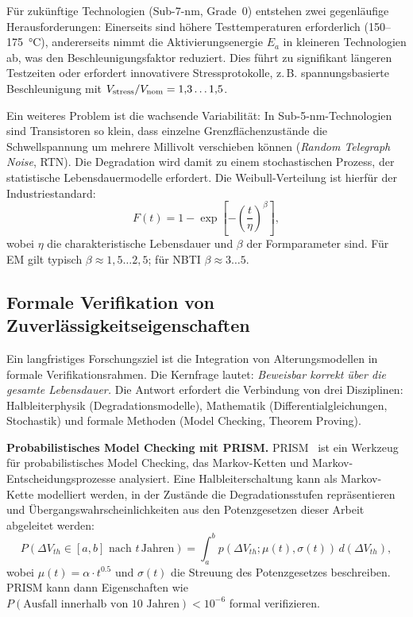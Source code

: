 ﻿\documentclass[a4paper,12pt]{article}
\theoremstyle{definition}
\begin{document}
Für zukünftige Technologien (Sub-7-nm, Grade~0) entstehen zwei gegenläufige
Herausforderungen: Einerseits sind höhere Testtemperaturen erforderlich
(150--175\, °C), andererseits nimmt die Aktivierungsenergie $E_a$ in
kleineren Technologien ab, was den Beschleunigungsfaktor reduziert. Dies
führt zu signifikant längeren Testzeiten oder erfordert innovativere
Stressprotokolle, z.\,B. spannungsbasierte Beschleunigung mit
$V_{\rm stress} / V_{\rm nom} = 1{,}3\ldots 1{,}5$.

Ein weiteres Problem ist die wachsende Variabilität: In Sub-5-nm-Technologien
sind Transistoren so klein, dass einzelne Grenzflächenzustände die
Schwellspannung um mehrere Millivolt verschieben können (\emph{Random
Telegraph Noise}, RTN). Die Degradation wird damit zu einem stochastischen
Prozess, der statistische Lebensdauermodelle erfordert. Die Weibull-Verteilung
ist hierfür der Industriestandard:
\[
F(t) = 1 - \exp\!\left[-\left(\frac{t}{\eta}\right)^\beta\right],
\]
wobei $\eta$ die charakteristische Lebensdauer und $\beta$ der Formparameter sind.
Für EM gilt typisch $\beta \approx 1{,}5\ldots 2{,}5$; für NBTI $\beta \approx 3\ldots 5$.

\subsection{Formale Verifikation von Zuverlässigkeitseigenschaften}
\label{sub:formal}

Ein langfristiges Forschungsziel ist die Integration von Alterungsmodellen in
formale Verifikationsrahmen. Die Kernfrage lautet: \emph{Beweisbar korrekt über
die gesamte Lebensdauer.} Die Antwort erfordert die Verbindung von drei Disziplinen:
Halbleiterphysik (Degradationsmodelle), Mathematik (Differentialgleichungen,
Stochastik) und formale Methoden (Model Checking, Theorem Proving).

\textbf{Probabilistisches Model Checking mit PRISM.}
PRISM~\cite{kwiatkowska2011} ist ein Werkzeug für probabilistisches Model Checking,
das Markov-Ketten und Markov-Entscheidungsprozesse analysiert. Eine
Halbleiterschaltung kann als Markov-Kette modelliert werden, in der Zustände
die Degradationsstufen repräsentieren und Übergangswahrscheinlichkeiten aus
den Potenzgesetzen dieser Arbeit abgeleitet werden:
\[
P(\Delta V_{th} \in [a, b] \text{ nach } t\,\text{Jahren}) =
\int_a^b p(\Delta V_{th}; \mu(t), \sigma(t))\, d(\Delta V_{th}),
\]
wobei $\mu(t) = \alpha \cdot t^{0.5}$ und $\sigma(t)$ die Streuung des
Potenzgesetzes beschreiben. PRISM kann dann Eigenschaften wie
$P(\text{Ausfall innerhalb von 10 Jahren}) < 10^{-6}$ formal verifizieren.
\end{document}
